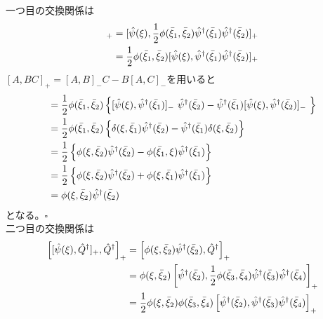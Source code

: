 \documentclass[dvipdfmx, 11pt, a4paper]{jsarticle}
\numberwithin{equation}{section}
\theoremstyle{definition}
\begin{document}
    \begin{derivationBox}
        一つ目の交換関係は
        \begin{align}
            [\hat{\psi}(\xi),\hat{Q}^\dagger]_{+} &= [\hat{\psi}(\xi),\frac{1}{2}\phi(\bar{\xi}_1,\bar{\xi}_2)\hat{\psi}^\dagger(\bar{\xi}_1)\hat{\psi}^\dagger(\bar{\xi}_2)]_{+} \notag \\
            &= \frac{1}{2} \phi(\bar{\xi}_1,\bar{\xi}_2) [\hat{\psi}(\xi),\hat{\psi}^\dagger(\bar{\xi}_1)\hat{\psi}^\dagger(\bar{\xi}_2)]_{+} 
        \end{align}
        $[A,BC]_{+} = [A,B]_{-}C - B[A,C]_{-}$を用いると
        \begin{align}
            &= \frac{1}{2} \phi(\bar{\xi}_1,\bar{\xi}_2) \left\{ [\hat{\psi}(\xi),\hat{\psi}^\dagger(\bar{\xi}_1)]_{-}\ \hat{\psi}^\dagger(\bar{\xi}_2) - \hat{\psi}^\dagger(\bar{\xi}_1) [\hat{\psi}(\xi),\hat{\psi}^\dagger(\bar{\xi}_2)]_{-}\ \right\} \notag \\
            &= \frac{1}{2} \phi(\bar{\xi}_1,\bar{\xi}_2) \left\{ \delta(\xi,\bar{\xi}_1) \hat{\psi}^\dagger(\bar{\xi}_2) - \hat{\psi}^\dagger(\bar{\xi}_1) \delta(\xi,\bar{\xi}_2) \right\} \notag \\
            &= \frac{1}{2}  \left\{ \phi(\xi,\bar{\xi}_2) \hat{\psi}^\dagger(\bar{\xi}_2) -\phi(\bar{\xi}_1,\xi) \hat{\psi}^\dagger(\bar{\xi}_1)  \right\} \notag \\
            &= \frac{1}{2}  \left\{ \phi(\xi,\bar{\xi}_2) \hat{\psi}^\dagger(\bar{\xi}_2) +\phi(\xi,\bar{\xi}_1) \hat{\psi}^\dagger(\bar{\xi}_1)  \right\} \notag \\
            &=  \phi(\xi,\bar{\xi}_2) \hat{\psi}^\dagger(\bar{\xi}_2)
        \end{align}
        となる。$\square$\\
        二つ目の交換関係は
        \begin{align}
            \left[ [\hat{\psi}(\xi),\hat{Q}^\dagger]_{+}, \hat{Q}^\dagger\right]_{+} &= \left[ \phi(\xi,\bar{\xi}_2) \hat{\psi}^\dagger(\bar{\xi}_2), \hat{Q}^\dagger\right]_{+} \notag \\
            &= \phi(\xi,\bar{\xi}_2) \left[  \hat{\psi}^\dagger(\bar{\xi}_2),\frac{1}{2} \phi(\bar{\xi}_3,\bar{\xi}_4)\hat{\psi}^\dagger(\bar{\xi}_3)\hat{\psi}^\dagger(\bar{\xi}_4)\right]_{+} \notag \\
            &= \frac{1}{2}\phi(\xi,\bar{\xi}_2) \phi(\bar{\xi}_3,\bar{\xi}_4) \left[  \hat{\psi}^\dagger(\bar{\xi}_2), \hat{\psi}^\dagger(\bar{\xi}_3)\hat{\psi}^\dagger(\bar{\xi}_4)\right]_{+} \notag \\

\end{align}
\end{derivationBox}
\end{document}
